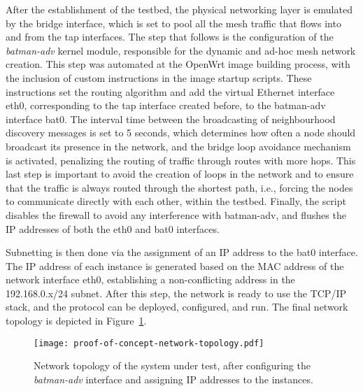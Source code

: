 After the establishment of the testbed, the physical networking layer is emulated by the bridge interface, which is set to pool all the mesh traffic that flows into and from the tap interfaces. The step that follows is the configuration of the \emph{batman-adv} kernel module, responsible for the dynamic and ad-hoc mesh network creation. This step was automated at the OpenWrt image building process, with the inclusion of custom instructions in the image startup scripts. These instructions set the routing algorithm and add the virtual Ethernet interface eth0, corresponding to the tap interface created before, to the batman-adv interface bat0. The interval time between the broadcasting of neighbourhood discovery messages is set to 5 seconds, which determines how often a node should broadcast its presence in the network, and the bridge loop avoidance mechanism is activated, penalizing the routing of traffic through routes with more hops. This last step is important to avoid the creation of loops in the network and to ensure that the traffic is always routed through the shortest path, i.e., forcing the nodes to communicate directly with each other, within the testbed. Finally, the script disables the firewall to avoid any interference with batman-adv, and flushes the IP addresses of both the eth0 and bat0 interfaces.

Subnetting is then done via the assignment of an IP address to the bat0 interface. The IP address of each instance is generated based on the MAC address of the network interface eth0, establishing a non-conflicting address in the 192.168.0.x/24 subnet. After this step, the network is ready to use the TCP/IP stack, and the \pol{} protocol can be deployed, configured, and run. The final network topology is depicted in Figure~\ref{fig:infrastructure:network-architecture}.

\begin{figure}[h!]
    \begin{center}
    \texttt{[image: proof-of-concept-network-topology.pdf]}
    \caption{Network topology of the system under test, after configuring the \emph{batman-adv} interface and assigning IP addresses to the instances.}
    \label{fig:infrastructure:network-architecture}
    \end{center}
\end{figure}